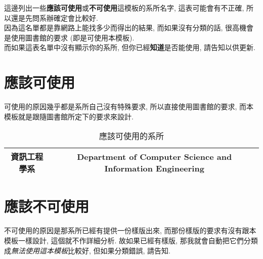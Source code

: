 
這邊列出一些\textbf{應該可使用}或\textbf{不可使用}這模板的系所名字, 這表可能會有不正確, 所以還是先問系辦確定會比較好. \\

因為這名單都是靠網路上能找多少而得出的結果, 而如果沒有分類的話, 很高機會是使用圖書館的要求 (即是可使用本模板). \\

而如果這表名單中沒有顯示你的系所, 但你已經\textbf{知道}是否能使用, 請告知以供更新.

\clearpage

\section{應該可使用}

  可使用的原因幾乎都是系所自己沒有特殊要求, 所以直接使用圖書館的要求, 而本模板就是跟隨圖書館所定下的要求來設計.

  \begin{table*}[ht!]
    \centering
    \caption{應該可使用的系所}
    \label{table:acceptable-dept:acceptable}
    \begin{tabular}{|c|c|}

    \hline
    \multicolumn{1}{|c|}{資訊工程學系} &
    \multicolumn{1}{c|}{Department of Computer Science and Information Engineering} \\

    \hline
    \end{tabular}
  \end{table*}

\section{應該不可使用}

  不可使用的原因是那系所已經有提供一份樣版出來, 而那份樣版的要求有沒有跟本模板一樣設計, 這個就不作詳細分析. 故如果已經有樣版, 那我就會自動把它們分類成\textit{無法使用這本模板}比較好, 但如果分類錯誤, 請告知.

